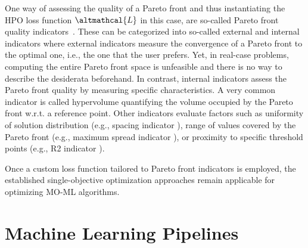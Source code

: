 One way of assessing the quality of a Pareto front and thus instantiating the HPO loss function $\altmathcal{L}$ in this case, are so-called Pareto front quality indicators~\citep{audet-ejor21}.
These can be categorized into so-called external and internal indicators where external indicators measure the convergence of a Pareto front to the optimal one, i.e., the one that the user prefers.
Yet, in real-case problems, computing the entire Pareto front space is unfeasible and there is no way to describe the desiderata beforehand.
In contrast, internal indicators assess the Pareto front quality by measuring specific characteristics.
A very common indicator is called hypervolume \citep{zitzler1999multiobjective} quantifying the volume occupied by the Pareto front w.r.t. a reference point.
Other indicators evaluate factors such as uniformity of solution distribution (e.g., spacing indicator \citep{schott1995fault}), range of values covered by the Pareto front (e.g., maximum spread indicator \citep{zitzler2000comparison}), or proximity to specific threshold points (e.g., R2 indicator \citep{hansen1994evaluating}).

Once a custom loss function tailored to Pareto front indicators is employed, the established single-objective optimization approaches remain applicable for optimizing MO-ML algorithms.


\section{Machine Learning Pipelines}

